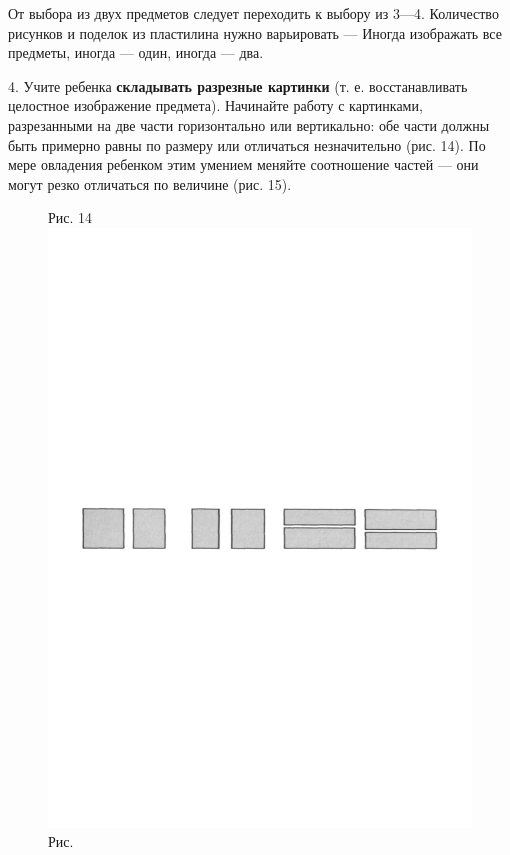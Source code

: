 \documentclass[a5paper]{book}
\begin{document}
От выбора из двух предметов следует переходить к выбору из 3---4.
Количество рисунков и поделок из пластилина нужно варьировать --- Иногда
изображать все предметы, иногда --- один, иногда --- два.

4. Учите ребенка \textbf{складывать разрезные картинки} (т. е.
восстанавливать целостное изображение предмета). Начинайте работу с
картинками, разрезанными на две части горизонтально или вертикально: обе
части должны быть примерно равны по размеру или отличаться незначительно
(рис. 14). По мере овладения ребенком этим умением меняйте соотношение
частей --- они могут резко отличаться по величине (рис. 15).

\begin{figure}
\centering
Рис. 14 \includegraphics[width=\linewidth]{media/media/image14.png} Рис.
\end{figure}
\end{document}
